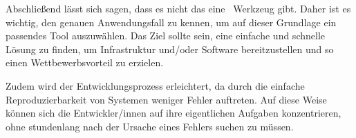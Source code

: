 
    Abschließend lässt sich sagen, dass es nicht das eine \grqq\ Werkzeug gibt. 
    Daher ist es wichtig, den genauen Anwendungsfall zu kennen, um auf dieser Grundlage ein passendes Tool auszuwählen.
    Das Ziel sollte sein, eine einfache und schnelle Lösung zu finden, um Infrastruktur und/oder Software bereitzustellen und so einen Wettbewerbsvorteil zu erzielen.

    Zudem wird der Entwicklungsprozess erleichtert, da durch die einfache Reproduzierbarkeit von Systemen weniger Fehler auftreten.
    Auf diese Weise können sich die Entwickler/innen auf ihre eigentlichen Aufgaben konzentrieren, ohne stundenlang nach der Ursache eines Fehlers suchen zu müssen.